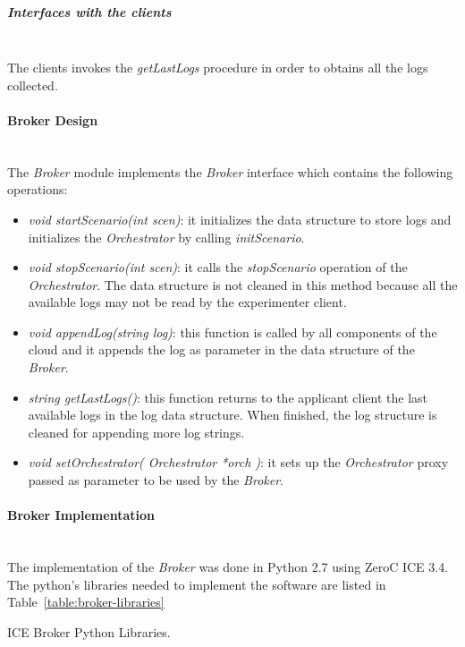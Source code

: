 \subparagraph{Interfaces with the clients}~\\

The clients invokes the \emph{getLastLogs} procedure in order to obtains
all the logs collected.

\paragraph{Broker Design}~\\

The \emph{Broker} module implements the \emph{Broker} interface which
contains the following operations:

\begin{itemize}
\item \emph{void startScenario(int scen)}: it initializes the data structure to
  store logs and initializes the \emph{Orchestrator} by calling \emph{initScenario}.
\item \emph{void stopScenario(int scen)}: it calls the \emph{stopScenario}
  operation of the \emph{Orchestrator}. The data structure is not cleaned in
  this method because all the available logs may not be read by the experimenter
  client.
\item \emph{void appendLog(string log)}: this function is called by all
  components of the  cloud and it appends the log as parameter in the data
  structure of the \emph{Broker}. 
\item \emph{string getLastLogs()}: this function returns to the applicant client
  the last available logs in the log data structure. When finished, the log structure is
  cleaned for appending more log strings.
\item \emph{void setOrchestrator( Orchestrator *orch )}: it sets up the
  \emph{Orchestrator} proxy passed as parameter to be
  used by the \emph{Broker}.
\end{itemize}


\paragraph{Broker Implementation}~\\

The implementation of the \emph{Broker} was done in Python 2.7 using ZeroC ICE 3.4. The
python's libraries needed to implement the software are listed in
Table~\ref{table:broker-libraries}

\begin{table}[hp]
  \centering
  {\small
  
  }
  \caption{ICE Broker Python Libraries.}
  \label{table:broker-libraries}
\end{table}


